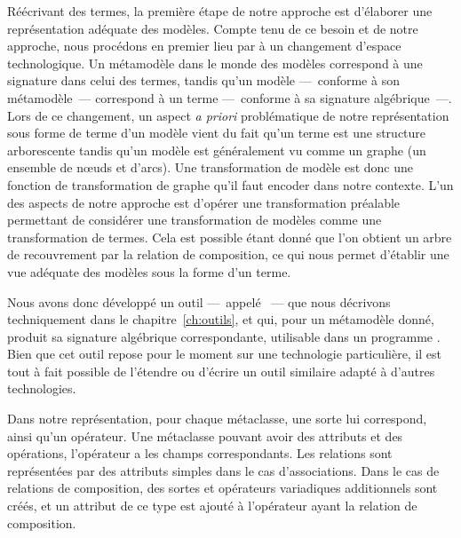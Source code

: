 Réécrivant des termes, la première étape de notre approche est d'élaborer une
représentation adéquate des modèles. Compte tenu de ce besoin et de notre
approche, nous procédons en premier lieu par à un changement d'espace
technologique. Un métamodèle dans le monde des modèles correspond à une
signature dans celui des termes, tandis qu'un modèle ---~conforme à son
métamodèle~--- correspond à un terme ---~conforme à sa signature
algébrique~---. Lors de ce changement, un aspect \emph{a priori} problématique
de notre représentation sous forme de terme d'un modèle vient du fait qu'un
terme est une structure arborescente tandis qu'un modèle est généralement vu
comme un graphe (un ensemble de nœuds et d'arcs). Une transformation de modèle
est donc une fonction de transformation de graphe qu'il faut encoder dans notre
contexte. L'un des aspects de notre approche est d'opérer une transformation
préalable permettant de considérer une transformation de modèles comme une
transformation de termes. Cela est possible étant donné que l'on obtient un
arbre de recouvrement par la relation de composition, ce qui nous permet
d'établir une vue adéquate des modèles sous la forme d'un terme.

Nous avons donc développé un outil ---~appelé {\tomemf}~--- que nous décrivons
techniquement dans le chapitre~\ref{ch:outils}, et qui, pour un métamodèle
{\emf} {\ecore} donné, produit sa signature algébrique {\tom} correspondante,
utilisable dans un programme {\tomjava}. Bien que cet outil repose pour le
moment sur une technologie particulière, il est tout à fait possible de
l'étendre ou d'écrire un outil similaire adapté à d'autres technologies.

Dans notre représentation, pour chaque métaclasse, une sorte lui correspond,
ainsi qu'un opérateur. Une métaclasse pouvant avoir des attributs et des
opérations, l'opérateur a les champs correspondants. Les relations sont
représentées par des attributs simples dans le cas d'associations. Dans le cas
de relations de composition, des sortes et opérateurs variadiques additionnels
sont créés, et un attribut de ce type est ajouté à l'opérateur ayant la
relation de composition.

